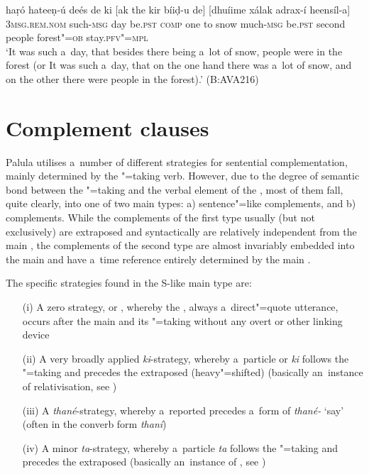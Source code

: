 \begin{exe}
\ex
\label{ex:13-126}
\gll haṛó hateeṇ-ú deés de ki [ak  the kir bíiḍ-u de] [dhuíime xálak  adrax-í heensíl-a] \\
\textsc{3msg.rem.nom} such-\textsc{msg}  day be.\textsc{pst} \textsc{comp} one  to snow much-\textsc{msg} be.\textsc{pst} second people  forest"=\textsc{ob} stay.\textsc{pfv"=mpl} \\
\glt `It was such a~day, that besides there being a~lot of snow, people were in the forest (or It was such a~day, that on the one hand there was a~lot of snow, and on the other there were people in the forest).' (B:AVA216)
\end{exe}

\section{Complement clauses}
\label{sec:13-5}

Palula utilises a~number of different strategies for sentential complementation, mainly determined by the "=taking verb. However, due to the degree of semantic bond between the "=taking  and the verbal element of the  \citep[39-40]{givon2001b}, most of them fall, quite clearly, into one of two main types: a) sentence"=like complements, and b)  complements. While the complements of the first type usually (but not exclusively) are extraposed and syntactically are relatively independent from the main , the complements of the second type are almost invariably embedded into the main  and have a~time reference entirely determined by the main .

The specific strategies found in the S-like main type are:

\begin{enumerate}
\item[(i)] A zero strategy, or , whereby the , always a~direct"=quote utterance, occurs after the main  and its "=taking  without any overt  or other linking device
\item[(ii)] A very broadly applied \textit{ki}-strategy, whereby a~particle or  \textit{ki} follows the "=taking  and precedes the extraposed (heavy"=shifted)   (basically an~instance of relativisation, see )
\item[(iii)] A \textit{thané}-strategy, whereby a~reported   precedes a~form of \textit{thané-} `say' (often in the converb form \textit{thaní})
\item[(iv)] A minor \textit{ta}-strategy, whereby a~particle \textit{ta} follows the "=taking  and precedes the extraposed   (basically an~instance of , see )
\end{enumerate}

